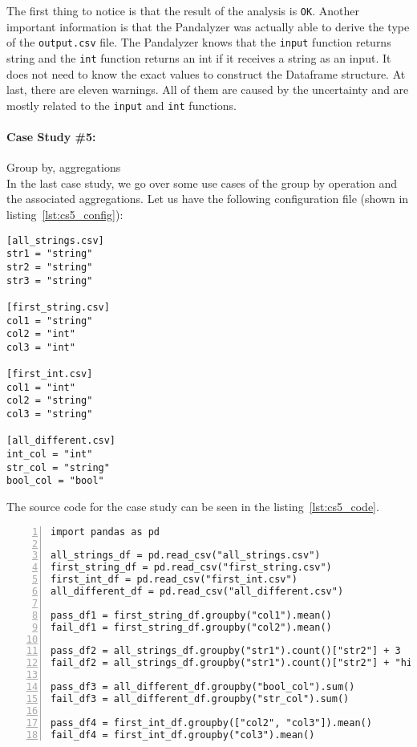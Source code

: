 The first thing to notice is that the result of the analysis is \verb|OK|.
Another important information is that the Pandalyzer was actually able to derive the type of the \verb|output.csv| file.
The Pandalyzer knows that the \verb|input| function returns string and the \verb|int| function returns an int if
it receives a string as an input.
It does not need to know the exact values to construct the Dataframe structure.
At last, there are eleven warnings.
All of them are caused by the uncertainty and are mostly related to the \verb|input| and \verb|int| functions.


\paragraph{Case Study \#5:} Group by, aggregations \\

In the last case study, we go over some use cases of the group by operation and the associated aggregations.
Let us have the following configuration file (shown in listing~\ref{lst:cs5_config}):

\begin{lstlisting}[caption=config.toml file for the fifth case study, label={lst:cs5_config}, captionpos=b]
[all_strings.csv]
str1 = "string"
str2 = "string"
str3 = "string"

[first_string.csv]
col1 = "string"
col2 = "int"
col3 = "int"

[first_int.csv]
col1 = "int"
col2 = "string"
col3 = "string"

[all_different.csv]
int_col = "int"
str_col = "string"
bool_col = "bool"
\end{lstlisting}

The source code for the case study can be seen in the listing~\ref{lst:cs5_code}.

\begin{lstlisting}[caption=Code of the fifth case study in Pandas, label={lst:cs5_code}, captionpos=b, numbers=left]
import pandas as pd

all_strings_df = pd.read_csv("all_strings.csv")
first_string_df = pd.read_csv("first_string.csv")
first_int_df = pd.read_csv("first_int.csv")
all_different_df = pd.read_csv("all_different.csv")

pass_df1 = first_string_df.groupby("col1").mean()
fail_df1 = first_string_df.groupby("col2").mean()

pass_df2 = all_strings_df.groupby("str1").count()["str2"] + 3
fail_df2 = all_strings_df.groupby("str1").count()["str2"] + "hi"

pass_df3 = all_different_df.groupby("bool_col").sum()
fail_df3 = all_different_df.groupby("str_col").sum()

pass_df4 = first_int_df.groupby(["col2", "col3"]).mean()
fail_df4 = first_int_df.groupby("col3").mean()
\end{lstlisting}

